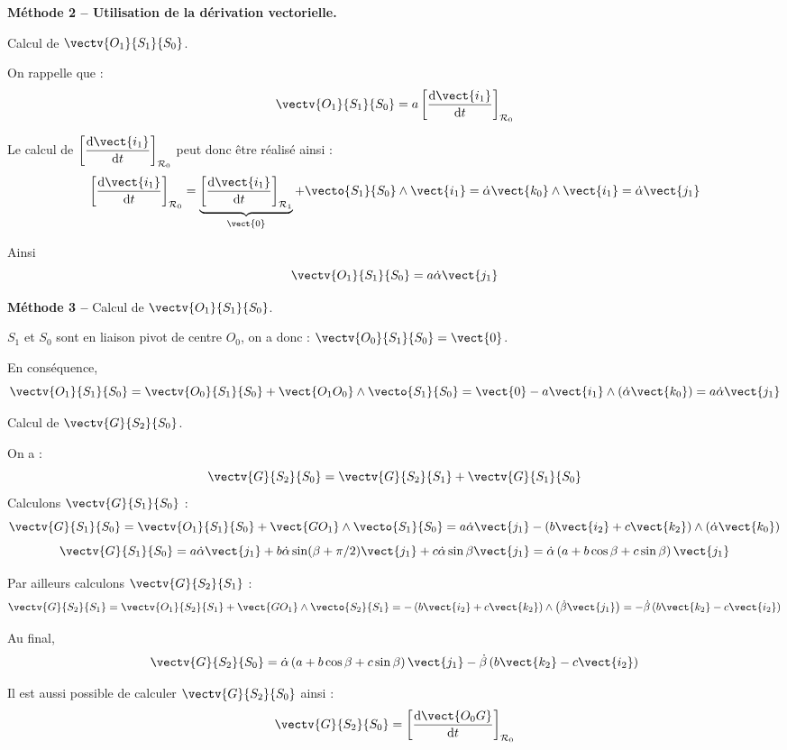\begin{corrige}
\textbf{Méthode 2 -- Utilisation de la dérivation vectorielle.}

Calcul de $\vectv{O_1}{S_1}{S_0}$.

On rappelle que :
$$
\vectv{O_1}{S_1}{S_0} 
= a \left[\dfrac{\text{d}  \vect{i_1} }{\text{d}t}\right]_{\mathcal{R}_0}
$$

Le calcul de $\left[\dfrac{\text{d}  \vect{i_1} }{\text{d}t}\right]_{\mathcal{R}_0}$ peut donc être réalisé ainsi : 
$$ 
\left[\dfrac{\text{d}  \vect{i_1} }{\text{d}t}\right]_{\mathcal{R}_0} = 
\underbrace{\left[\dfrac{\text{d}  \vect{i_1} }{\text{d}t}\right]_{\mathcal{R}_1}}_{\vect{0}} + \vecto{S_1}{S_0}\wedge \vect{i_1}
=\dot{\alpha}\vect{k_0}  \wedge \vect{i_1}
=\dot{\alpha} \vect{j_1}
$$

Ainsi 
$$
\vectv{O_1}{S_1}{S_0} 
= a \dot{\alpha} \vect{j_1}
$$

\textbf{Méthode 3 -- }
Calcul de $\vectv{O_1}{S_1}{S_0}$.

$S_1$ et $S_0$ sont en liaison pivot de centre $O_0$, on a donc :  $\vectv{O_0}{S_1}{S_0}=\vect{0}$.

En conséquence, 
$$
\vectv{O_1}{S_1}{S_0} = \vectv{O_0}{S_1}{S_0} + \vect{O_1O_0}\wedge   \vecto{S_1}{S_0} = \vect{0} - a \vect{i_1} \wedge \left( \dot{\alpha}\vect{k_0} \right)
=a \dot{\alpha}\vect{j_1}
$$

\end{corrige}\else \fi

%
%
%
%
\ifprof
\begin{corrige}

Calcul de $\vectv{G}{S_2}{S_0}$.

On a : 
$$\vectv{G}{S_2}{S_0} = \vectv{G}{S_2}{S_1} + \vectv{G}{S_1}{S_0} $$
Calculons $\vectv{G}{S_1}{S_0}$ :
$$
\vectv{G}{S_1}{S_0} 
= \vectv{O_1}{S_1}{S_0} + \vect{GO_1}\wedge\vecto{S_1}{S_0}
= a\dot{\alpha}\vect{j_1} - \left(b\vect{i_2} + c\vect{k_2}\right) \wedge\left( \dot{\alpha} \vect{k_0}\right)
$$
$$
\vectv{G}{S_1}{S_0} 
= a\dot{\alpha}\vect{j_1}  + b\dot{\alpha} \sin(\beta+\pi/2) \vect{j_1} + c \dot{\alpha}\sin\beta\vect{j_1}
= \dot{\alpha} \left(a+b \cos\beta + c \sin\beta\right) \vect{j_1} 
$$

Par ailleurs calculons $\vectv{G}{S_2}{S_1}$ :
$$\vectv{G}{S_2}{S_1} = \vectv{O_1}{S_2}{S_1} + \vect{GO_1}\wedge \vecto{S_2}{S_1}
=-\left(b\vect{i_2}+c\vect{k_2}\right) \wedge \left(\dot{\beta}\vect{j_1}\right)
=-\dot{\beta}\left(b\vect{k_2}-c\vect{i_2} \right)
$$

Au final, 
$$\vectv{G}{S_2}{S_0} = \dot{\alpha} \left(a+b \cos\beta + c \sin\beta\right) \vect{j_1} 
-\dot{\beta}\left(b\vect{k_2}-c\vect{i_2} \right)
$$

Il est aussi possible de calculer $\vectv{G}{S_2}{S_0}$ ainsi : 
$$\vectv{G}{S_2}{S_0} = \left[\dfrac{\text{d} \vect{O_0G}}{\text{d}t}\right]_{\mathcal{R}_0}$$ 

\end{corrige}\else \fi




